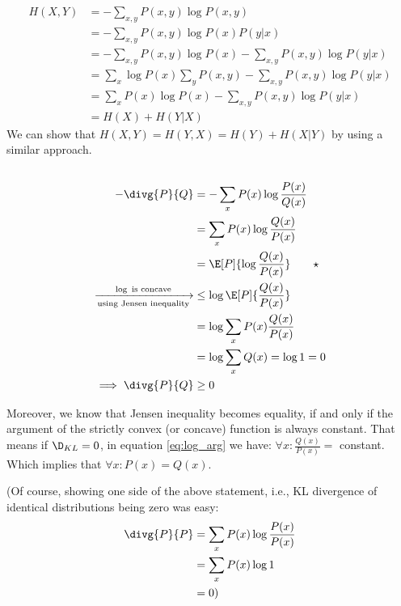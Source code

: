 \documentclass{article}
\begin{document}
\subsection{}
\label{sec:3c}
\begin{align*}
H(X, Y) &= - \sum_{x, y} P(x, y) \log P(x, y)\\
&= - \sum_{x, y} P(x, y) \log P(x) P(y|x)\\
&= - \sum_{x, y} P(x, y) \log P(x) - \sum_{x, y} P(x, y) \log P(y|x)\\
&= \sum_{x} \log P(x) \sum_{y} P(x, y) - \sum_{x, y} P(x, y) \log P(y|x)\\
&= \sum_{x} P(x) \log P(x) - \sum_{x, y} P(x, y) \log P(y|x)\\
&= H(X) + H(Y|X)
\end{align*}
We can show that \(H(X, Y) = H(Y, X) = H(Y) + H(X|Y)\) by using a similar approach.

\subsection{}
\begin{align*}
- \divg{P}{Q} &= - \sum_{x} P(x) \log \frac{P(x)}{Q(x)}\\
&= \sum_{x} P(x) \log \frac{Q(x)}{P(x)}\\
&= \E[P]{\log \frac{Q(x)}{P(x)}} \label{eq:log_arg}\tag*{\(\star\)}\\
\xrightarrow[\text{using Jensen inequality}]{\log \text{ is concave}} & \le \log \E[P]{\frac{Q(x)}{P(x)}}\\
&= \log \sum_{x} P(x) \frac{Q(x)}{P(x)}\\
&= \log \sum_{x} Q(x) = \log 1 = 0\\
\implies \divg{P}{Q} &\ge 0
\end{align*}

Moreover, we know that Jensen inequality becomes equality, if and only if the argument of the strictly convex (or concave) function is always constant.
That means if \({\D}_{KL} = 0\), in equation \eqref{eq:log_arg} we have: \(\forall x: \frac{Q(x)}{P(x)} = \) constant.
Which implies that \(\forall x: P(x) = Q(x)\).

(Of course, showing one side of the above statement, i.e., KL divergence of identical distributions being zero was easy:
\begin{align*}
\divg{P}{P} &= \sum_{x} P(x) \log \frac{P(x)}{P(x)}\\
&= \sum_{x} P(x) \log 1\\
&= 0)
\end{align*}
\end{document}
